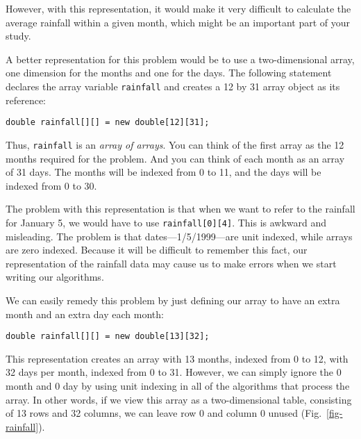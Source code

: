 \noindent However, with this representation, it would make it very
difficult to calculate the average rainfall within a given month,
which might be an important part of your study.

A better representation for this problem would be to
use a two-dimensional array, one dimension for the months and one
for the days.  The following statement declares the array
variable {\tt rainfall} and creates a 12 by 31 array object
as its reference:

\begin{jjjlisting}
\begin{lstlisting}
double rainfall[][] = new double[12][31];
\end{lstlisting}
\end{jjjlisting}

\noindent Thus, {\tt rainfall} is an {\it array of arrays}.
You can think of the first array as the 12 months required for the
problem.  And you can think of each month as an array of 31 days.
The months will be indexed from 0 to 11, and the days will be
indexed from 0 to 30.

The problem with this representation is that when we want to refer to
the rainfall for January 5, we would have to use
{\tt rainfall[0][4]}. This is awkward and misleading.  The problem is that
dates---1/5/1999---are unit indexed, while arrays are zero
indexed.  Because it will be difficult to remember this fact, our
representation of the rainfall data may cause us to make errors when
we start writing our algorithms.

We can easily remedy this problem by just defining our array to
have an extra month and an extra day each month:

\begin{jjjlisting}
\begin{lstlisting}
double rainfall[][] = new double[13][32];
\end{lstlisting}
\end{jjjlisting}

\noindent This representation creates an array with 13 months, indexed
from 0 to 12, with 32 days per month, indexed from 0 to 31. However,
we can simply ignore the 0 month and 0 day by using unit indexing in
all of the algorithms that process the array.  In other words,
if we view this array as a two-dimensional table, consisting of
13 rows and 32 columns, we can leave row 0 and column 0 unused
(Fig.~\ref{fig-rainfall}).

